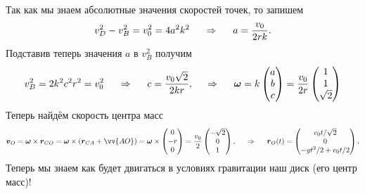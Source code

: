 Так как мы знаем абсолютные значения скоростей точек, то запишем
\begin{equation*}
    v_D^2 - v_B^2 = v_0^2 = 4 a^2 k^2
    \hspace{0.5cm} \Rightarrow \hspace{0.5cm} 
    a = \frac{v_0}{2rk}.
\end{equation*}
Подставив теперь значения $a$ в $v_B^2$ получим
\begin{equation*}
    v_B^2 = 2 k^2 c^2 r^2 = v_0^2
    \hspace{0.5cm} \Rightarrow \hspace{0.5cm} 
    c = \frac{v_0 \sqrt{2}}{2kr},
    \hspace{0.5cm} \Rightarrow \hspace{0.5cm} 
    \mbox{\boldmath $\omega$} = k \begin{pmatrix}
        a \\ b \\ c
    \end{pmatrix} = \frac{v_0}{2r} \begin{pmatrix}
        1 \\ 1 \\ \sqrt{2}
    \end{pmatrix}
\end{equation*}
Теперь найдём скорость центра масс
\begin{equation*}
    \vc{v}_O = \vc{\omega} \times \vc{r}_{CO} = 
    \vc{\omega} \times \left(
        \vc{r}_{CA} + \vv{AO}
    \right) = \vc{\omega} \times \begin{pmatrix}
        0 \\ - r \\ 0
    \end{pmatrix} = 
    \frac{v_0}{2} \begin{pmatrix}
        -\sqrt{2} \\ 0 \\ 1
    \end{pmatrix},
    \hspace{0.5cm} \Rightarrow \hspace{0.5cm} 
    \vc{r}_O(t) = 
    \begin{pmatrix}
        v_0 t / \sqrt{2} \\
        0 \\
        -gt^2/2+v_0 t / 2
    \end{pmatrix}.
\end{equation*}
Теперь мы знаем как будет двигаться в условиях гравитации наш диск (его центр масс)! 

